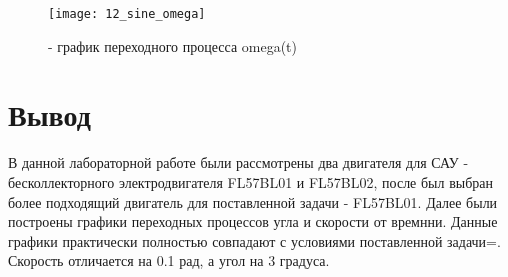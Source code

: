 \begin{figure}[H]
	\begin{center}
		\texttt{[image: 12\_sine\_omega]}
		\caption{- график переходного процесса omega(t)} 
		\label{pic:pic_7} %
	\end{center}
\end{figure}

\newpage

\section{Вывод}
В данной лабораторной работе были рассмотрены два двигателя для САУ - бесколлекторного электродвигателя FL57BL01 и FL57BL02, после был выбран более подходящий двигатель для поставленной задачи - FL57BL01. Далее были построены графики переходных процессов угла и скорости от времнни. Данные графики практически полностью совпадают с условиями поставленной задачи=. Скорость отличается на 0.1 рад, а угол на 3 градуса.


